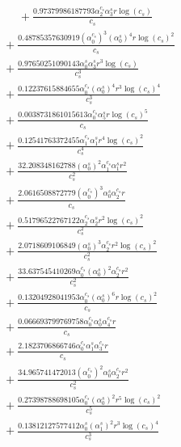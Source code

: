 \documentclass[10pt]{article}
\begin{document}
\begin{align*}
\phantom{R_{0,8}} &\phantom{={}}{}  + \frac{0.97379986187793 \alpha_{2}^{c_s} \alpha_{3}^s r \log{\left(c_{s} \right)}}{c_{s}} \\
&{}  + \frac{0.48785357630919 \left(\alpha_{0}^{c_s}\right)^{3} \left(\alpha_{0}^s\right)^{4} r \log{\left(c_{s} \right)}^{2}}{c_{s}} \\
&{}  + \frac{0.97650251090143 \alpha_{0}^s \alpha_{3}^s r^{3} \log{\left(c_{s} \right)}}{c_{s}^{3}} \\
&{}  + \frac{0.12237615884655 \alpha_{0}^{c_s} \left(\alpha_{0}^s\right)^{4} r^{3} \log{\left(c_{s} \right)}^{4}}{c_{s}^{3}} \\
&{}  + \frac{0.0038731861015613 \alpha_{0}^{c_s} \alpha_{5}^s r \log{\left(c_{s} \right)}^{5}}{c_{s}} \\
&{}  + \frac{0.12541763372455 \alpha_{1}^{c_s} \alpha_{1}^s r^{4} \log{\left(c_{s} \right)}^{2}}{c_{s}^{4}} \\
&{}  + \frac{32.208348162788 \left(\alpha_{0}^s\right)^{2} \alpha_{1}^{c_s} \alpha_{1}^s r^{2}}{c_{s}^{2}} \\
&{}  + \frac{2.0616508872779 \left(\alpha_{0}^{c_s}\right)^{3} \alpha_{0}^s \alpha_{2}^{c_s} r}{c_{s}} \\
&{}  + \frac{0.51796522767122 \alpha_{2}^{c_s} \alpha_{2}^s r^{2} \log{\left(c_{s} \right)}^{2}}{c_{s}^{2}} \\
&{}  + \frac{2.0718609106849 \left(\alpha_{0}^s\right)^{3} \alpha_{2}^{c_s} r^{2} \log{\left(c_{s} \right)}^{2}}{c_{s}^{2}} \\
&{}  + \frac{33.637545410269 \alpha_{0}^{c_s} \left(\alpha_{0}^s\right)^{2} \alpha_{2}^{c_s} r^{2}}{c_{s}^{2}} \\
&{}  + \frac{0.13204928041953 \alpha_{0}^{c_s} \left(\alpha_{0}^s\right)^{6} r \log{\left(c_{s} \right)}^{2}}{c_{s}} \\
&{}  + \frac{0.066693799769758 \alpha_{0}^{c_s} \alpha_{0}^s \alpha_{4}^{c_s} r}{c_{s}} \\
&{}  + \frac{2.1823706866746 \alpha_{0}^{c_s} \alpha_{1}^s \alpha_{3}^{c_s} r}{c_{s}} \\
&{}  + \frac{34.965741472013 \left(\alpha_{0}^{c_s}\right)^{2} \alpha_{0}^s \alpha_{2}^{c_s} r^{2}}{c_{s}^{2}} \\
&{}  + \frac{0.27398788698105 \alpha_{0}^{c_s} \left(\alpha_{0}^s\right)^{2} r^{5} \log{\left(c_{s} \right)}^{2}}{c_{s}^{5}} \\
&{}  + \frac{0.13812127577412 \alpha_{0}^s \left(\alpha_{1}^s\right)^{2} r^{3} \log{\left(c_{s} \right)}^{4}}{c_{s}^{3}} \\

\end{align*}
\end{document}
